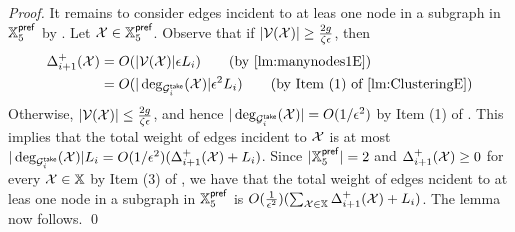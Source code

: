 \begin{proof}
	It remains to consider edges incident to at leas one node in a subgraph in $\mathbb{X}_5^{\mathsf{pref}}$ by . Let $\mathcal{X} \in \mathbb{X}_5^{\mathsf{pref}}$. Observe that if $|\mathcal{V}(\mathcal{X})|\geq \frac{2g}{\zeta\epsilon}$, then
	\begin{equation*}
		\begin{split}
			\Delta_{i+1}^+(\mx) &= O(|\mv(\mx)|\eps L_i)  \qquad \mbox{(by \Cref{lm:manynodes1E})}\\
			& =  O(|\deg_{\mg_i^{\take}}(\mx)|\eps^2 L_i)   \qquad \mbox{(by Item (1) of \Cref{lm:ClusteringE})}
		\end{split}
	\end{equation*}
	Otherwise, $|\mathcal{V}(\mathcal{X})| \leq \frac{2g}{\zeta\epsilon}$, and hence $|\deg_{\mathcal{G}_i^{\mathsf{take}}}(\mathcal{X})| = O(1/\epsilon^2)$ by Item (1) of . This implies that the total weight of edges incident to $\mathcal{X}$ is at most $|\deg_{\mathcal{G}_i^{\mathsf{take}}}(\mathcal{X})| L_i = O(1/\epsilon^2) (\Delta_{i+1}^+(\mathcal{X}) + L_i)$. Since $|\mathbb{X}_5^{\mathsf{pref}}| = 2$ and $\Delta^+_{i+1}(\mathcal{X})\geq 0$ for every $\mathcal{X} \in \mathbb{X}$ by Item (3) of , we have that the total weight of edges ncident to at leas one node in a subgraph in $\mathbb{X}_5^{\mathsf{pref}}$ is $O(\frac{1}{\epsilon^2})(\sum_{\mathcal{X} \in \mathbb{X}} \Delta_{i+1}^+(\mathcal{X}) + L_i)$. The lemma now follows.  \qed
\end{proof}









